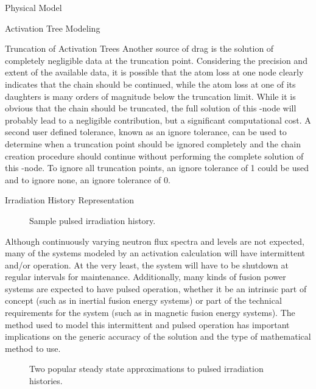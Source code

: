 \begin{chapter}{Physical Model\label{chap:physical}}
\begin{section}{Activation Tree Modeling\label{sec:physical.chains}}
\begin{subsection}{Truncation of Activation Trees}
    Another source of drag is the solution of completely negligible
    data at the truncation point.  Considering the precision and
    extent of the available data, it is possible that the atom loss at
    one node clearly indicates that the chain should be continued,
    while the atom loss at one of its daughters is many orders of
    magnitude below the truncation limit.  While it is obvious that
    the chain should be truncated, the full solution of this \pc-node
    will probably lead to a negligible contribution, but a significant
    computational cost.  A second user defined tolerance, known as an
    ignore tolerance, can be used to determine when a truncation point
    should be ignored completely and the chain creation procedure
    should continue without performing the complete solution of this
    \pc-node.  To ignore all truncation points, an ignore tolerance of
    1 could be used and to ignore none, an ignore tolerance of 0.
    
  \end{subsection}
\end{section}

\begin{section}{Irradiation History Representation}
  
  \begin{figure}[htbp]
    \begin{center}
      \leavevmode
      \caption{Sample pulsed irradiation history.}
      \label{fig:physical.pulses}
    \end{center}
  \end{figure}

  Although continuously varying neutron flux spectra and levels are
  not expected, many of the systems modeled by an activation
  calculation will have intermittent and/or operation.  At the very
  least, the system will have to be shutdown at regular intervals for
  maintenance.  Additionally, many kinds of fusion power systems are
  expected to have pulsed operation, whether it be an intrinsic part
  of concept (such as in inertial fusion energy systems) or part of
  the technical requirements for the system (such as in magnetic
  fusion energy systems).  The method used to model this intermittent
  and pulsed operation has important implications on the generic
  accuracy of the solution and the type of mathematical method to use.
  
  \begin{figure}[htbp]
    \begin{center}
         \caption{Two popular steady state approximations to pulsed irradiation histories.}\label{fig:physical.ss_approx}
    \end{center}
  \end{figure}


\end{section}
\end{chapter}
